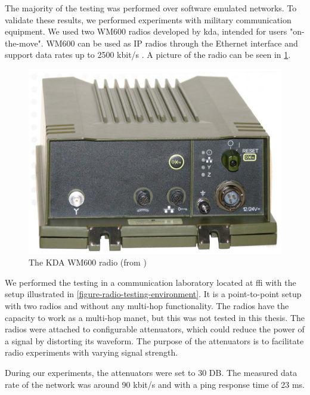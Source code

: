 The majority of the testing was performed over software emulated networks. To
validate these results, we performed experiments with military communication
equipment. We used two WM600 radios developed by \gls{kda}, intended for users
"on-the-move". WM600 can be used as IP radios through the Ethernet interface and
support data rates up to 2500 kbit/s \cite{kongsberg-wm600}. A picture of the
radio can be seen in \cref{figure-kdawm600}.

\begin{figure}[h]
\centering
\includegraphics[scale=0.2]{images/kda_wm600.jpg}
\caption{The KDA WM600 radio (from \cite{kongsberg-wm600})}
\label{figure-kdawm600}
\end{figure}

We performed the testing in a communication laboratory located at \gls{ffi} with
the setup illustrated in \cref{figure-radio-testing-environment}. It is a
point-to-point setup with two radios and without any multi-hop functionality.
The radios have the capacity to work as a multi-hop \gls{manet}, but this was not
tested in this thesis. The radios were attached to configurable attenuators,
which could reduce the power of a signal by distorting its waveform. The purpose
of the attenuators is to facilitate radio experiments with varying signal
strength.

During our experiments, the attenuators were set to 30 DB. The measured data
rate of the network was around 90 kbit/s and with a ping response time of 23 ms.

